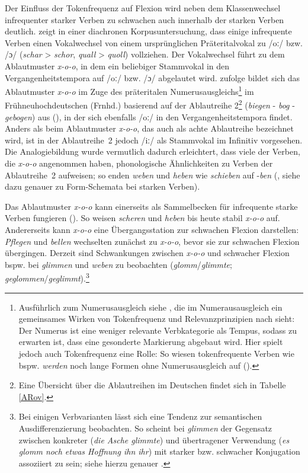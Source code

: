 Der Einfluss der Tokenfrequenz auf Flexion wird neben dem Klassenwechsel infrequenter starker Verben zu schwachen auch innerhalb der starken Verben deutlich. \textcite{Nowak.2013} zeigt in einer diachronen Korpusuntersuchung, dass einige infrequente Verben einen Vokalwechsel von einem ursprünglichen Präteritalvokal zu /oː/ bzw. /ɔ/ (\textit{schar} > \textit{schor}, \textit{quall} > \textit{quoll}) vollziehen. Der Vokalwechsel führt zu dem Ablautmuster \textit{x-o-o}, in dem ein beliebiger Stammvokal in den Vergangenheitstempora auf /oː/ bzw. /ɔ/ abgelautet wird. \textcite[127--128]{Nowak.2016} zufolge bildet sich das Ablautmuster \textit{x-o-o} im Zuge des präteritalen Numerusausgleichs\footnote{Ausführlich zum Numerusausgleich siehe \textcite{Nubling.1998}, die im Numerausausgleich ein gemeinsames Wirken von Tokenfrequenz und Relevanzprinzipien nach \textcite{Bybee.1985} sieht: Der Numerus ist eine weniger relevante Verbkategorie als Tempus, sodass zu erwarten ist, dass eine gesonderte Markierung abgebaut wird. Hier spielt jedoch auch Tokenfrequenz eine Rolle: So wiesen tokenfrequente Verben wie bspw. \textit{werden} noch lange Formen ohne Numerusausgleich auf (\cite[198]{Nubling.1998}).} im Frühneuhochdeutschen (Frnhd.) basierend auf der Ablautreihe 2\footnote{Eine Übersicht über die Ablautreihen im Deutschen findet sich in Tabelle \ref{ARov}.} (\textit{biegen} - \textit{bog} - \textit{gebogen}) aus (\cite[170]{Nowak.2013}), in der sich ebenfalls /oː/ in den Vergangenheitstempora findet. Anders als beim Ablautmuster \textit{x-o-o}, das auch als achte Ablautreihe bezeichnet wird, ist in der Ablautreihe~2 jedoch /iː/ als Stammvokal im Infinitiv vorgesehen. Die Analogiebildung wurde vermutlich dadurch erleichtert, dass viele der Verben, die \textit{x-o-o} angenommen haben, phonologische Ähnlichkeiten zu Verben der Ablautreihe~2 aufweisen; so enden \textit{weben} und \textit{heben} wie \textit{schieben} auf -\textit{ben} (\cite[166]{Nowak.2018}, siehe dazu genauer  zu Form-Schemata bei starken Verben). 



Das Ablautmuster \textit{x-o-o} kann einerseits als Sammelbecken für infrequente starke Verben fungieren (\cite[183]{Nowak.2013}). So weisen \textit{scheren} und \textit{heben}  bis heute stabil \textit{x-o-o} auf. Andererseits kann \textit{x-o-o} eine Übergangsstation zur schwachen Flexion darstellen: \textit{Pflegen} und \textit{bellen} wechselten zunächst zu \textit{x-o-o}, bevor sie zur schwachen Flexion übergingen. Derzeit sind Schwankungen zwischen \textit{x-o-o} und schwacher Flexion bspw. bei \textit{glimmen} und \textit{weben} zu beobachten (\textit{glomm}/\textit{glimmte}; \textit{geglommen}/\textit{geglimmt}).\footnote{Bei einigen Verbvarianten lässt sich eine Tendenz zur semantischen Ausdifferenzierung beobachten. So scheint bei \textit{glimmen} der Gegensatz zwischen konkreter (\textit{die Asche glimmte}) und übertragener Verwendung (\textit{es glomm noch etwas Hoffnung ihn ihr}) mit starker bzw. schwacher Konjugation assoziiert zu sein; siehe hierzu genauer \textcite{Nowak.2011}.} 

